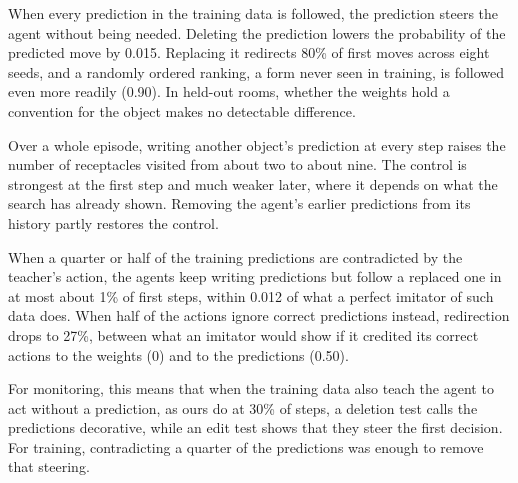 

When every prediction in the training data is followed, the prediction steers the agent without being needed. Deleting the prediction lowers the probability of the predicted move by 0.015. Replacing it redirects 80\% of first moves across eight seeds, and a randomly ordered ranking, a form never seen in training, is followed even more readily (0.90). In held-out rooms, whether the weights hold a convention for the object makes no detectable difference.

Over a whole episode, writing another object's prediction at every step raises the number of receptacles visited from about two to about nine. The control is strongest at the first step and much weaker later, where it depends on what the search has already shown. Removing the agent's earlier predictions from its history partly restores the control.

When a quarter or half of the training predictions are contradicted by the teacher's action, the agents keep writing predictions but follow a replaced one in at most about 1\% of first steps, within 0.012 of what a perfect imitator of such data does. When half of the actions ignore correct predictions instead, redirection drops to 27\%, between what an imitator would show if it credited its correct actions to the weights (0) and to the predictions (0.50).

For monitoring, this means that when the training data also teach the agent to act without a prediction, as ours do at 30\% of steps, a deletion test calls the predictions decorative, while an edit test shows that they steer the first decision. For training, contradicting a quarter of the predictions was enough to remove that steering.
